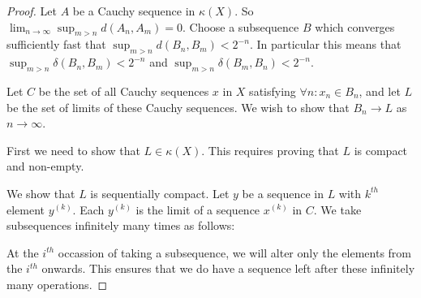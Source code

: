 \documentclass[a4paper,11pt]{article}
\begin{document}
\begin{proof}
Let $A$ be a Cauchy sequence in $\kappa(X)$.  So
$\lim_{n\to\infty}\sup_{m>n}d(A_n,A_m)=0$.  Choose a subsequence $B$ which
converges sufficiently fast that $\sup_{m>n}d(B_n,B_m)<2^{-n}$.  In particular
this means that $\sup_{m>n}\delta(B_n,B_m)<2^{-n}$ and
$\sup_{m>n}\delta(B_m,B_n)<2^{-n}$.

Let $C$ be the set of all Cauchy sequences $x$ in $X$ satisfying
$\forall n:x_n\in B_n$, and let $L$ be the set of limits of these Cauchy
sequences.  We wish to show that $B_n\to L$ as $n\to\infty$.

First we need to show that $L\in\kappa(X)$.  This requires proving that $L$ is
compact and non-empty.

We show that $L$ is sequentially compact.  Let $y$ be a sequence in $L$ with
$k^{th}$ element $y^{(k)}$.  Each
$y^{(k)}$ is the limit of a sequence $x^{(k)}$ in $C$.  We take subsequences
infinitely many times as follows:

At the $i^{th}$ occassion of taking a subsequence, we will alter only the
elements from the $i^{th}$ onwards.  This ensures that we do have a sequence
left after these infinitely many operations.


\end{proof}
\end{document}
